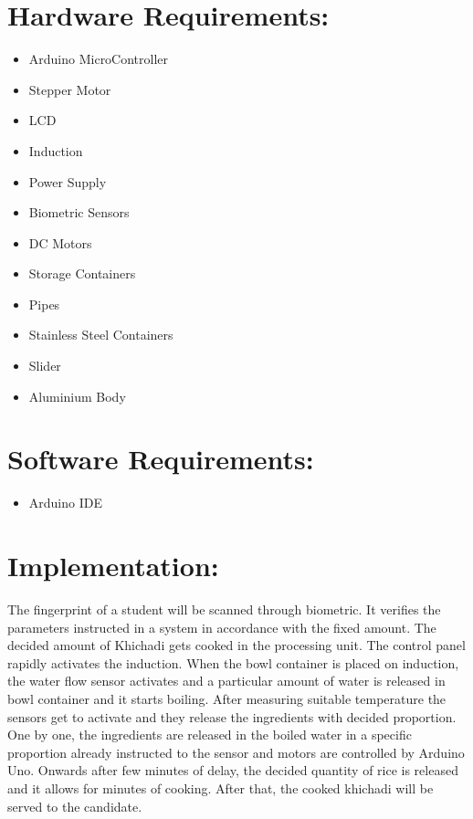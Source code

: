 \documentclass{article}
\begin{document}
\section{Hardware Requirements:}
\begin{itemize}
	\item Arduino MicroController
	\item Stepper Motor
	\item LCD
	\item Induction
	\item Power Supply
	\item Biometric Sensors
	\item DC Motors
	\item Storage Containers
	\item Pipes
	\item Stainless Steel Containers
	\item Slider
	\item Aluminium Body
\end{itemize}

\section{Software Requirements:}
\begin{itemize}
	\item Arduino IDE
\end{itemize}

\section{Implementation:}
The fingerprint of a student will be scanned through biometric. It verifies the parameters instructed in a
system in accordance with the fixed amount. The decided amount of Khichadi gets cooked in the processing
unit. The control panel rapidly activates the induction. When the bowl container is placed on induction, the
water flow sensor activates and a particular amount of water is released in bowl container and it starts
boiling. After measuring suitable temperature the sensors get to activate and they release the ingredients with
decided proportion. One by one, the ingredients are released in the boiled water in a specific proportion
already instructed to the sensor and motors are controlled by Arduino Uno. Onwards after few minutes of
delay, the decided quantity of rice is released and it allows for minutes of cooking. After that, the cooked
khichadi will be served to the candidate. \\
\end{document}
